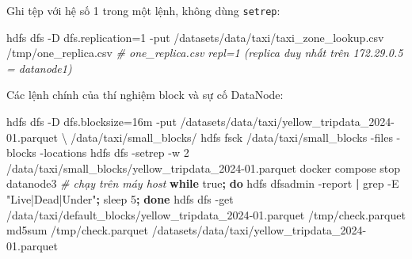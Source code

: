 \documentclass[
  12pt,
  a4paper,
]{article}
\newenvironment{Shaded}{}{}
\newcommand{\AttributeTok}[1]{\textcolor[rgb]{0.49,0.56,0.16}{#1}}
\newcommand{\CommentTok}[1]{\textcolor[rgb]{0.38,0.63,0.69}{\textit{#1}}}
\newcommand{\ControlFlowTok}[1]{\textcolor[rgb]{0.00,0.44,0.13}{\textbf{#1}}}
\newcommand{\DataTypeTok}[1]{\textcolor[rgb]{0.56,0.13,0.00}{#1}}
\newcommand{\ExtensionTok}[1]{#1}
\newcommand{\FunctionTok}[1]{\textcolor[rgb]{0.02,0.16,0.49}{#1}}
\newcommand{\KeywordTok}[1]{\textcolor[rgb]{0.00,0.44,0.13}{\textbf{#1}}}
\newcommand{\NormalTok}[1]{#1}
\newcommand{\StringTok}[1]{\textcolor[rgb]{0.25,0.44,0.63}{#1}}
\begin{document}
Ghi tệp với hệ số 1 trong một lệnh, không dùng \texttt{setrep}:

\begin{Shaded}
\begin{Highlighting}[]
\ExtensionTok{hdfs}\NormalTok{ dfs }\AttributeTok{{-}D}\NormalTok{ dfs.replication=1 }\AttributeTok{{-}put}\NormalTok{ /datasets/data/taxi/taxi\_zone\_lookup.csv /tmp/one\_replica.csv}
\CommentTok{\# one\_replica.csv repl=1   (replica duy nhất trên 172.29.0.5 = datanode1)}
\end{Highlighting}
\end{Shaded}

Các lệnh chính của thí nghiệm block và sự cố DataNode:

\begin{Shaded}
\begin{Highlighting}[]
\ExtensionTok{hdfs}\NormalTok{ dfs }\AttributeTok{{-}D}\NormalTok{ dfs.blocksize=16m }\AttributeTok{{-}put}\NormalTok{ /datasets/data/taxi/yellow\_tripdata\_2024{-}01.parquet }\DataTypeTok{\textbackslash{}}
\NormalTok{    /data/taxi/small\_blocks/}
\ExtensionTok{hdfs}\NormalTok{ fsck /data/taxi/small\_blocks }\AttributeTok{{-}files} \AttributeTok{{-}blocks} \AttributeTok{{-}locations}
\ExtensionTok{hdfs}\NormalTok{ dfs }\AttributeTok{{-}setrep} \AttributeTok{{-}w}\NormalTok{ 2 /data/taxi/small\_blocks/yellow\_tripdata\_2024{-}01.parquet}
\ExtensionTok{docker}\NormalTok{ compose stop datanode3          }\CommentTok{\# chạy trên máy host}
\ControlFlowTok{while} \FunctionTok{true}\KeywordTok{;} \ControlFlowTok{do} \ExtensionTok{hdfs}\NormalTok{ dfsadmin }\AttributeTok{{-}report} \KeywordTok{|} \FunctionTok{grep} \AttributeTok{{-}E} \StringTok{"Live|Dead|Under"}\KeywordTok{;} \FunctionTok{sleep}\NormalTok{ 5}\KeywordTok{;} \ControlFlowTok{done}
\ExtensionTok{hdfs}\NormalTok{ dfs }\AttributeTok{{-}get}\NormalTok{ /data/taxi/default\_blocks/yellow\_tripdata\_2024{-}01.parquet /tmp/check.parquet}
\FunctionTok{md5sum}\NormalTok{ /tmp/check.parquet /datasets/data/taxi/yellow\_tripdata\_2024{-}01.parquet}
\end{Highlighting}
\end{Shaded}
\end{document}
